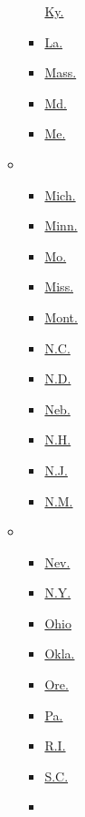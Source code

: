 \begin{itemize}
\begin{itemize}
\begin{itemize}
      \href{../states/kentucky.html}{Ky.}
    \item
      \href{../states/louisiana.html}{La.}
    \item
      \href{../states/massachusetts.html}{Mass.}
    \item
      \href{../states/maryland.html}{Md.}
    \item
      \href{../states/maine.html}{Me.}
    \end{itemize}
  \item
    \begin{itemize}
    \tightlist
    \item
      \href{../states/michigan.html}{Mich.}
    \item
      \href{../states/minnesota.html}{Minn.}
    \item
      \href{../states/missouri.html}{Mo.}
    \item
      \href{../states/mississippi.html}{Miss.}
    \item
      \href{../states/montana.html}{Mont.}
    \item
      \href{../states/north-carolina.html}{N.C.}
    \item
      \href{../states/north-dakota.html}{N.D.}
    \item
      \href{../states/nebraska.html}{Neb.}
    \item
      \href{../states/new-hampshire.html}{N.H.}
    \item
      \href{../states/new-jersey.html}{N.J.}
    \item
      \href{../states/new-mexico.html}{N.M.}
    \end{itemize}
  \item
    \begin{itemize}
    \tightlist
    \item
      \href{../states/nevada.html}{Nev.}
    \item
      \href{../states/new-york.html}{N.Y.}
    \item
      \href{../states/ohio.html}{Ohio}
    \item
      \href{../states/oklahoma.html}{Okla.}
    \item
      \href{../states/oregon.html}{Ore.}
    \item
      \href{../states/pennsylvania.html}{Pa.}
    \item
      \href{../states/rhode-island.html}{R.I.}
    \item
      \href{../states/south-carolina.html}{S.C.}
    \item

\end{itemize}
\end{itemize}
\end{itemize}
